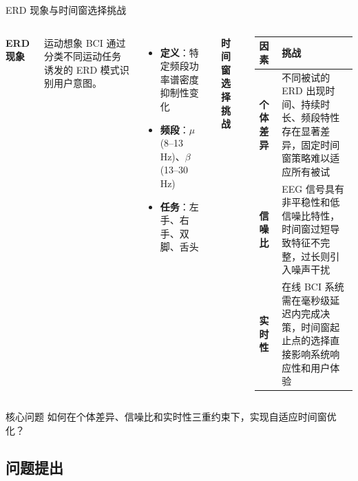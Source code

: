 \begin{frame}{ERD 现象与时间窗选择挑战}
    \begin{columns}[T]
        \textbf{ERD 现象}\cite{pfurtscheller1999event}
        
        运动想象 BCI 通过分类不同运动任务诱发的 ERD 模式识别用户意图。
        
        \begin{itemize}
            \item \textbf{定义}：特定频段功率谱密度抑制性变化
            \item \textbf{频段}：$\mu$ (8--13 Hz)、$\beta$ (13--30 Hz)
            \item \textbf{任务}：左手、右手、双脚、舌头
        \end{itemize}

        \textbf{时间窗选择挑战}
        \renewcommand{\arraystretch}{1.3}
        \footnotesize
        \begin{tabular}{p{0.7cm}|p{5.2cm}}
            \hline
            \textbf{因素} & \textbf{挑战} \\
            \hline
            \textbf{个体差异} & 不同被试的 ERD 出现时间、持续时长、频段特性存在显著差异，固定时间窗策略难以适应所有被试\cite{zhang2019temporally} \\
            \hline
            \textbf{信噪比} & EEG 信号具有非平稳性和低信噪比特性，时间窗过短导致特征不完整，过长则引入噪声干扰\cite{blankertz2008optimizing} \\
            \hline
            \textbf{实时性} & 在线 BCI 系统需在毫秒级延迟内完成决策，时间窗起止点的选择直接影响系统响应性和用户体验\cite{tangermann2012review} \\
            \hline
        \end{tabular}
    \end{columns}
    
    \begin{alertblock}{核心问题}
        如何在个体差异、信噪比和实时性三重约束下，实现自适应时间窗优化？
    \end{alertblock}
\end{frame}

\subsection{问题提出}

